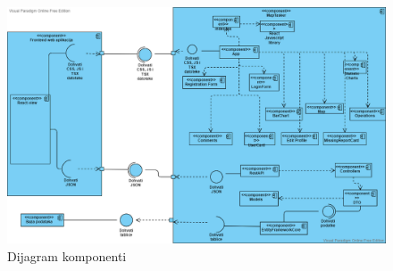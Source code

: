 			\begin{figure}[H] \includegraphics[width=\linewidth]{./dijagrami/ComponentDiagram.vpd.png}
				\caption{Dijagram komponenti}
			\end{figure}
		
		\eject
